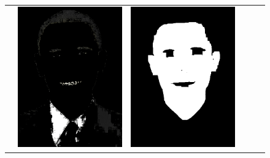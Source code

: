 \documentclass[journal,onecolumn]{IEEEtran}
\begin{document}
\begin{figure}[htb]
{\begin{tabular}{cccccc}
&

	\includegraphics[scale=0.3]{images/hairDetect.png}

&

	\includegraphics[scale=0.3]{images/skinQuantization.png}


\end{tabular}}
\end{figure}
\end{document}
